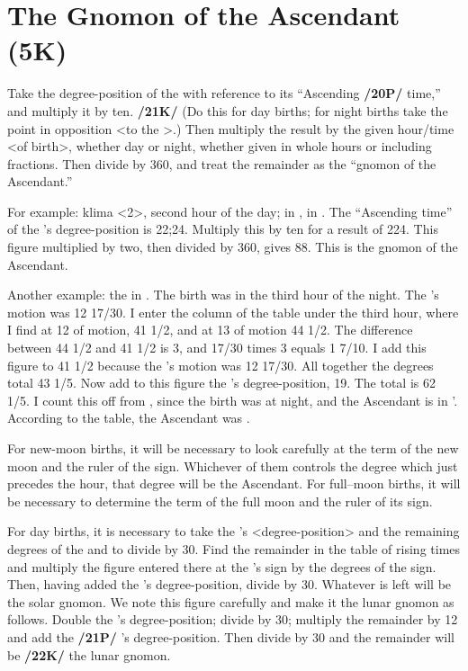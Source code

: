 \section{The Gnomon of the Ascendant (5K)}

Take the degree-position of the \Sun\xspace with reference to its “Ascending \textbf{/20P/} time,” and multiply it by ten. \textbf{/21K/} (Do this for day births; for night births take the point in opposition <to the \Sun>.) Then multiply the result by the given hour/time <of birth>, whether day or night, whether given in whole hours or including fractions. Then divide by 360, and treat the remainder as the “gnomon of the Ascendant.”

For example: klima <2>, second hour of the day; \Sun\xspace in \Cancer\xspace 21\deg, \Moon\xspace in \Aries\xspace 22\deg. The “Ascending time” of the \Sun’s degree-position is 22;24. Multiply this by ten for a result of 224. This figure multiplied by two, then divided by 360\deg, gives 88. This is the gnomon of the Ascendant.

Another example: the \Sun\xspace in \Capricorn\xspace 19\deg. The birth was in the third hour of the night. The \Moon’s motion was 12 17/30\deg. I enter the column of the table under the third hour, where I find at 12 of motion, 41 1/2, and at 13 of motion 44 1/2. The difference between 44 1/2 and 41 1/2 is 3, and 17/30\deg\xspace times 3 equals 1 7/10\deg. I add this figure to 41 1/2 because the \Moon’s motion was 12 17/30\deg. All
together the degrees total 43 1/5. Now add to this figure the \Sun’s degree-position, 19\deg. The total is 62 1/5\deg. I count this off from \Cancer\xspace, since the birth was at night, and the Ascendant is in \Virgo\xspace 2'.
According to the table, the Ascendant was \Virgo\xspace 3\deg.

For new-moon births, it will be necessary to look carefully at the term of the new moon and the ruler of the sign. Whichever of them controls the degree which just precedes the hour, that degree will be the Ascendant. For full–moon births, it will be necessary to determine the term of the full moon and the ruler
of its sign.

For day births, it is necessary to take the \Sun’s <degree-position> and the remaining degrees of the \Moon and to divide by 30. Find the remainder in the table of rising times and multiply the figure entered there at the \Sun’s sign by the degrees of the sign. Then, having added the \Sun’s degree-position, divide by 30. Whatever is left will be the solar gnomon. We note this figure carefully and make it the lunar gnomon as follows. Double the \Moon’s degree-position; divide by 30; multiply the remainder by 12 and add the \textbf{/21P/} \Moon’s degree-position. Then divide by 30 and the remainder will be \textbf{/22K/} the lunar gnomon.

